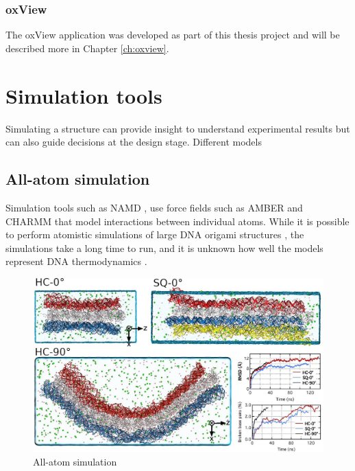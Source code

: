 \subsubsection{oxView}
The oxView application was developed as part of this thesis project and will be described more in Chapter \ref{ch:oxview}.

\section{Simulation tools}
Simulating a structure can provide insight to understand experimental results but can also guide decisions at the design stage. Different models

\subsection{All-atom simulation}
Simulation tools such as NAMD \cite{NAMDphillips2005scalable}, use force fields such as AMBER \cite{AMBERcornell1996second} and CHARMM \cite{brooks1983charmm} that model interactions between individual atoms. While it is possible to perform atomistic simulations of large DNA origami structures \cite{yoo2013situ}, the simulations take a long time to run, and it is unknown how well the models represent DNA thermodynamics \cite{sengar2021primer}.


\begin{figure}[h]
  \begin{center}
    \includegraphics[width=\textwidth]{figures/all-atom.jpg}
    \caption{All-atom simulation}
    \label{fig:all-atom}
  \end{center}
\end{figure}

